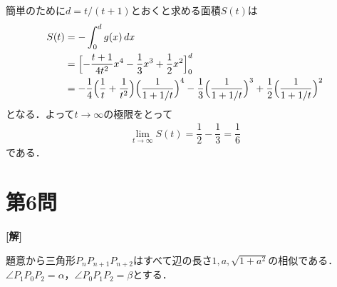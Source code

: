 \documentclass[../main.tex]{subfiles}
\begin{document}
簡単のために$d=t/(t+1)$とおくと求める面積$S(t)$は
\begin{align}
  S(t)
  &=-\int_0^dg(x)\,dx\\
  &=\Bigl[-\dfrac{t+1}{4t^2}x^4-\dfrac{1}{3}x^3+\dfrac{1}{2}x^2\Bigr]_0^d\\
  &=-\dfrac{1}{4}\Bigl(\dfrac{1}{t}+\dfrac{1}{t^2}\Bigr)
  \Bigl(\dfrac{1}{1+1/t}\Bigr)^4
  -\dfrac{1}{3}\Bigl(\dfrac{1}{1+1/t}\Bigr)^3
  +\dfrac{1}{2}\Bigl(\dfrac{1}{1+1/t}\Bigr)^2
\end{align}
となる．よって$t\to\infty$の極限をとって
\begin{align}
  \lim_{t\to\infty}S(t)=\dfrac{1}{2}-\dfrac{1}{3}=\dfrac{1}{6}
\end{align}
である．

\newpage
\section*{第6問}

{\bf [解]}

題意から三角形$P_nP_{n+1}P_{n+2}$はすべて辺の長さ$1,a,\sqrt{1+a^2}$の相似である．
$\angle P_1P_0P_2=\alpha$，$\angle P_0P_1P_2=\beta$とする．
\end{document}
